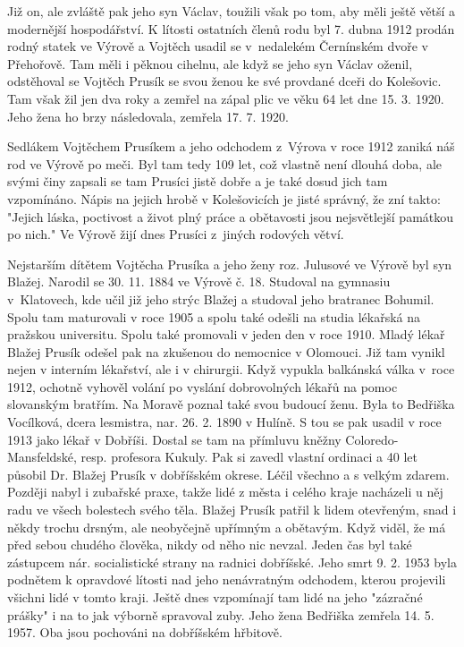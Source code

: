 \documentclass[../dejiny-rodu-prusiku.tex]{subfiles}
\begin{document}
Již on, ale zvláště pak jeho syn Václav, toužili však po tom, aby měli ještě větší a modernější hospodářství. K lítosti ostatních členů rodu byl 7. dubna 1912 prodán rodný statek ve Výrově a Vojtěch usadil se v nedalekém Černínském dvoře v Přehořově. Tam měli i pěknou cihelnu, ale když se jeho syn Václav oženil, odstěhoval se Vojtěch
Prusík se svou ženou ke své provdané dceři do Kolešovic. Tam však žil jen dva roky a zemřel na zápal plic ve věku 64 let dne 15. 3. 1920. Jeho žena ho brzy následovala, zemřela 17. 7. 1920.

Sedlákem Vojtěchem Prusíkem a jeho odchodem z Výrova v roce 1912 zaniká náš rod ve Výrově po meči. Byl tam tedy 109 let, což vlastně není dlouhá doba, ale svými činy zapsali se tam Prusíci jistě dobře a je také dosud jich tam vzpomínáno. Nápis na jejich hrobě v Kolešovicích je jisté správný, že zní takto: "Jejich láska, poctivost a život plný práce a obětavosti jsou nejsvětlejší památkou po nich." Ve Výrově žijí dnes Prusíci z jiných rodových větví.

Nejstarším dítětem Vojtěcha Prusíka a jeho ženy roz. Julusové ve Výrově byl syn Blažej. Narodil se 30. 11. 1884 ve Výrově č. 18. Studoval na gymnasiu v Klatovech, kde učil již jeho strýc Blažej a studoval jeho bratranec Bohumil. Spolu tam maturovali v roce 1905 a spolu také odešli na studia lékařská na pražskou universitu. Spolu také promovali v jeden den v roce 1910. Mladý lékař Blažej Prusík odešel pak na zkušenou do nemocnice v Olomouci. Již tam vynikl nejen v interním lékařství, ale i v chirurgii. Když vypukla balkánská válka v roce 1912, ochotně vyhověl volání po vyslání dobrovolných lé­kařů na pomoc slovanským bratřím. Na Moravě poznal také svou budoucí ženu. Byla to Bedřiška Vocílková, dcera lesmistra, nar. 26. 2. 1890 v Hulíně. S tou se pak usadil v roce 1913 jako lékař v Dobříši. Dostal se tam na přímluvu kněžny Coloredo-Mansfeldské, resp. profesora Kukuly. Pak si zavedl vlastní ordinaci a 40 let působil Dr. Blažej Prusík v dobříšském okrese. Léčil všechno a s vel­kým zdarem. Později nabyl i zubařské praxe, takže li­dé z města i celého kraje nacházeli u něj radu ve všech bolestech svého těla. Blažej Prusík patřil k lidem ote­vřeným, snad i někdy trochu drsným, ale neobyčejně upřímným a obětavým. Když viděl, že má před sebou chudého člověka, nikdy od něho nic nevzal. Jeden čas byl také zástupcem nár. socialistické strany na radnici dobříšské. Jeho smrt 9. 2. 1953 byla podnětem k opravdové lítosti nad jeho nenávratným odchodem, kterou projevili všichni lidé v tomto kraji. Ještě dnes vzpomínají tam lidé na jeho "zázračné prášky" i na to jak výborně spravoval zuby. Jeho žena Bedřiška zemřela 14. 5. 1957. Oba jsou pochová­ni na dobříšském hřbitově.
\end{document}
